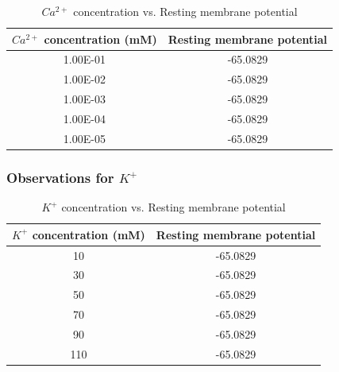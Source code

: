 \documentclass{report}
\begin{document}
\begin{table}[!ht]
    \centering
      \caption{$Ca^{2+}$ concentration vs. Resting membrane potential}
      \vspace{0.5cm}
      \label{tab:table2}
      
      \begin{tabular}{|c|c|}
        \hline
        \textbf{$Ca^{2+}$ concentration (mM)} & \textbf{Resting membrane potential} \\
        \hline
        1.00E-01 &	-65.0829 \\
        \hline
        1.00E-02 &	-65.0829 \\
        \hline
        1.00E-03 &	-65.0829 \\
        \hline
        1.00E-04 & 	-65.0829 \\
        \hline
        1.00E-05 &	-65.0829 \\
        \hline
      \end{tabular}
    \end{table}

\subsubsection*{Observations for $K^{+}$}

\begin{table}[!ht]
    \centering
      \caption{$K^{+}$ concentration vs. Resting membrane potential}
      \vspace{0.5cm}
      \label{tab:table3}
      
      \begin{tabular}{|c|c|}
        \hline
        \textbf{$K^{+}$ concentration (mM)} & \textbf{Resting membrane potential} \\
        \hline
        10 &	-65.0829 \\
        \hline
        30 &	-65.0829 \\
        \hline
        50 &	-65.0829 \\
        \hline
        70 & 	-65.0829 \\
        \hline
        90 &	-65.0829 \\
        \hline
        110 &	-65.0829 \\
        \hline
      \end{tabular}
    \end{table}
\end{document}
